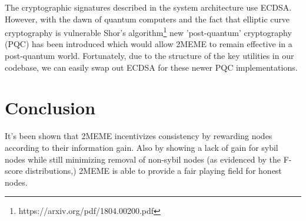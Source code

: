 \documentclass{article}
\begin{document}
	The cryptographic signatures described in the system architecture use ECDSA. However, with the dawn of quantum computers and the fact that elliptic curve cryptography is vulnerable Shor's algorithm\footnote{https://arxiv.org/pdf/1804.00200.pdf} new 'post-quantum' cryptography (PQC) has been introduced which would allow 2MEME to remain effective in a post-quantum world. Fortunately, due to the structure of the key utilities in our codebase, we can easily swap out ECDSA for these newer PQC implementations. 

	
\section{Conclusion}
It's been shown that 2MEME incentivizes consistency by rewarding nodes according to their information gain. Also by showing a lack of gain for sybil nodes while still minimizing removal of non-sybil nodes (as evidenced by the F-score distributions,) 2MEME is able to provide a fair playing field for honest nodes.
	
	
\end{document}
